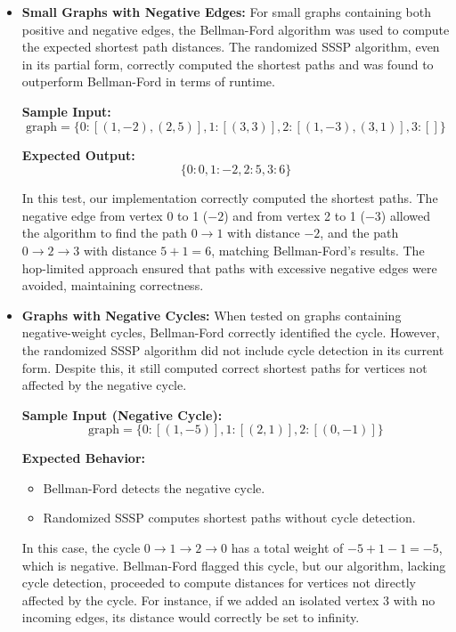 \documentclass[12pt]{article}
\begin{document}
\begin{itemize}
    \item \textbf{Small Graphs with Negative Edges:} 
    For small graphs containing both positive and negative edges, the Bellman-Ford algorithm was used to compute the expected shortest path distances. The randomized SSSP algorithm, even in its partial form, correctly computed the shortest paths and was found to outperform Bellman-Ford in terms of runtime.

    \textbf{Sample Input:}
    \[
    \text{graph} = \{ 0: [(1, -2), (2, 5)], 1: [(3, 3)], 2: [(1, -3), (3, 1)], 3: [] \}
    \]

    \textbf{Expected Output:}
    \[
    \{ 0: 0, 1: -2, 2: 5, 3: 6 \}
    \]

    In this test, our implementation correctly computed the shortest paths. The negative edge from vertex 0 to 1 (\(-2\)) and from vertex 2 to 1 (\(-3\)) allowed the algorithm to find the path \(0 \to 1\) with distance \(-2\), and the path \(0 \to 2 \to 3\) with distance \(5 + 1 = 6\), matching Bellman-Ford’s results. The hop-limited approach ensured that paths with excessive negative edges were avoided, maintaining correctness.

    \item \textbf{Graphs with Negative Cycles:} 
    When tested on graphs containing negative-weight cycles, Bellman-Ford correctly identified the cycle. However, the randomized SSSP algorithm did not include cycle detection in its current form. Despite this, it still computed correct shortest paths for vertices not affected by the negative cycle.

    \textbf{Sample Input (Negative Cycle):}
    \[
    \text{graph} = \{ 0: [(1, -5)], 1: [(2, 1)], 2: [(0, -1)] \}
    \]

    \textbf{Expected Behavior:}
    \begin{itemize}
        \item Bellman-Ford detects the negative cycle.
        \item Randomized SSSP computes shortest paths without cycle detection.
    \end{itemize}

    In this case, the cycle \(0 \to 1 \to 2 \to 0\) has a total weight of \(-5 + 1 - 1 = -5\), which is negative. Bellman-Ford flagged this cycle, but our algorithm, lacking cycle detection, proceeded to compute distances for vertices not directly affected by the cycle. For instance, if we added an isolated vertex 3 with no incoming edges, its distance would correctly be set to infinity.


\end{itemize}
\end{document}
